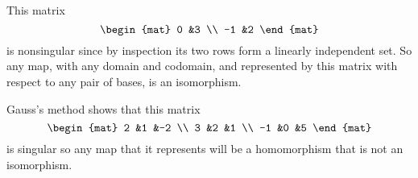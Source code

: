 \documentclass[10pt,t]{beamer}
\begin{document}
\begin{frame}
\ex
This matrix
\begin{equation*}
  \begin{mat}
    0  &3  \\
   -1  &2
  \end{mat}
\end{equation*}
is nonsingular since by inspection its two rows form a linearly independent
set.
So any map, with any domain and codomain, and represented by this matrix  
with respect to any pair of bases,
is an isomorphism.

\pause
\ex
Gauss's method shows that this matrix
\begin{equation*}
  \begin{mat}
    2  &1  &-2  \\
    3  &2  &1   \\
   -1  &0  &5
  \end{mat}
\end{equation*}
is singular so any map that it represents will be a homomorphism that
is not an isomorphism.
\end{frame}




% 
\end{document}
